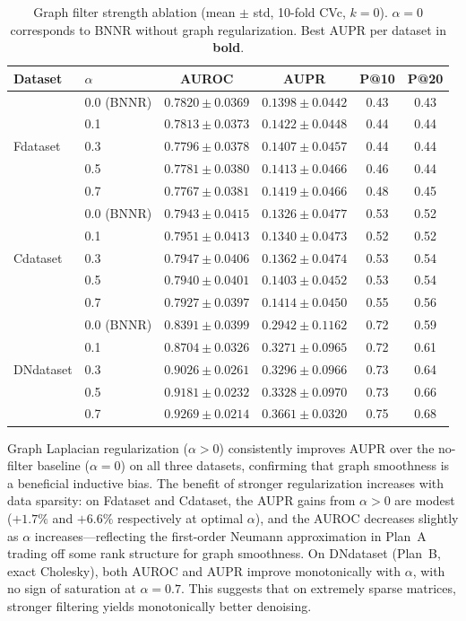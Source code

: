 \documentclass[webpdf,modern,large]{oup-authoring-template}
\begin{document}
\begin{table}[tb]
\centering
\caption{Graph filter strength ablation (mean $\pm$ std, 10-fold CVc, $k=0$). $\alpha = 0$ corresponds to BNNR without graph regularization. Best AUPR per dataset in \textbf{bold}.}
\label{tab:alpha}
\small
\begin{tabular}{llcccc}
\toprule
Dataset & $\alpha$ & AUROC & AUPR & P@10 & P@20 \\
\midrule
\multirow{5}{*}{Fdataset}
& 0.0 (BNNR) & $0.7820 \pm 0.0369$ & $0.1398 \pm 0.0442$ & 0.43 & 0.43 \\
& 0.1 & $0.7813 \pm 0.0373$ & $\mathbf{0.1422 \pm 0.0448}$ & 0.44 & 0.44 \\
& 0.3 & $0.7796 \pm 0.0378$ & $0.1407 \pm 0.0457$ & 0.44 & 0.44 \\
& 0.5 & $0.7781 \pm 0.0380$ & $0.1413 \pm 0.0466$ & 0.46 & 0.44 \\
& 0.7 & $0.7767 \pm 0.0381$ & $0.1419 \pm 0.0466$ & 0.48 & 0.45 \\
\midrule
\multirow{5}{*}{Cdataset}
& 0.0 (BNNR) & $0.7943 \pm 0.0415$ & $0.1326 \pm 0.0477$ & 0.53 & 0.52 \\
& 0.1 & $\mathbf{0.7951 \pm 0.0413}$ & $0.1340 \pm 0.0473$ & 0.52 & 0.52 \\
& 0.3 & $0.7947 \pm 0.0406$ & $0.1362 \pm 0.0474$ & 0.53 & 0.54 \\
& 0.5 & $0.7940 \pm 0.0401$ & $0.1403 \pm 0.0452$ & 0.53 & 0.54 \\
& 0.7 & $0.7927 \pm 0.0397$ & $\mathbf{0.1414 \pm 0.0450}$ & 0.55 & 0.56 \\
\midrule
\multirow{5}{*}{DNdataset}
& 0.0 (BNNR) & $0.8391 \pm 0.0399$ & $0.2942 \pm 0.1162$ & 0.72 & 0.59 \\
& 0.1 & $0.8704 \pm 0.0326$ & $0.3271 \pm 0.0965$ & 0.72 & 0.61 \\
& 0.3 & $0.9026 \pm 0.0261$ & $0.3296 \pm 0.0966$ & 0.73 & 0.64 \\
& 0.5 & $0.9181 \pm 0.0232$ & $0.3328 \pm 0.0970$ & 0.73 & 0.66 \\
& 0.7 & $\mathbf{0.9269 \pm 0.0214}$ & $\mathbf{0.3661 \pm 0.0320}$ & 0.75 & 0.68 \\
\bottomrule
\end{tabular}
\end{table}

Graph Laplacian regularization ($\alpha > 0$) consistently improves AUPR over the no-filter baseline ($\alpha = 0$) on all three datasets, confirming that graph smoothness is a beneficial inductive bias. The benefit of stronger regularization increases with data sparsity: on Fdataset and Cdataset, the AUPR gains from $\alpha > 0$ are modest ($+1.7\%$ and $+6.6\%$ respectively at optimal $\alpha$), and the AUROC decreases slightly as $\alpha$ increases---reflecting the first-order Neumann approximation in Plan~A trading off some rank structure for graph smoothness. On DNdataset (Plan~B, exact Cholesky), both AUROC and AUPR improve monotonically with $\alpha$, with no sign of saturation at $\alpha = 0.7$. This suggests that on extremely sparse matrices, stronger filtering yields monotonically better denoising.
\end{document}
